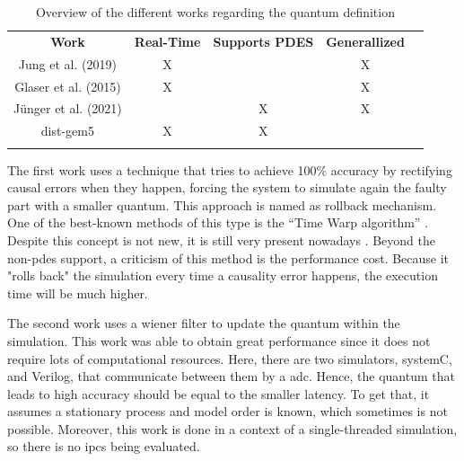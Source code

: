 \begin{table}[H]
\centering
\begin{tabular}{ccccl}
\cline{1-4}
\multicolumn{1}{|c|}{\cellcolor[HTML]{9B9B9B}\textbf{Work}} & \multicolumn{1}{c|}{\cellcolor[HTML]{9B9B9B}\textbf{Real-Time}} & \multicolumn{1}{c|}{\cellcolor[HTML]{9B9B9B}\textbf{Supports PDES}} & \multicolumn{1}{c|}{\cellcolor[HTML]{9B9B9B}\textbf{Generallized}} &  \\ \cline{1-4}
\multicolumn{1}{|c|}{Jung et al. \cite{optimist2} (2019)} & \multicolumn{1}{c|}{X} & \multicolumn{1}{c|}{} & \multicolumn{1}{c|}{X} &  \\ \cline{1-4}
\multicolumn{1}{|c|}{Glaser et al. \cite{GlaserTD} (2015)} & \multicolumn{1}{c|}{X} & \multicolumn{1}{c|}{} & \multicolumn{1}{c|}{X} &  \\ \cline{1-4}
\multicolumn{1}{|c|}{Jünger et al. \cite{optimizingTD} (2021)} & \multicolumn{1}{c|}{} & \multicolumn{1}{c|}{X} & \multicolumn{1}{c|}{X} &  \\ \cline{1-4}
\multicolumn{1}{|c|}{dist-gem5 \cite{dist-gem5}} & \multicolumn{1}{c|}{X} & \multicolumn{1}{c|}{X} & \multicolumn{1}{c|}{} &  \\ \cline{1-4}
\multicolumn{1}{l}{} & \multicolumn{1}{l}{} & \multicolumn{1}{l}{} & \multicolumn{1}{l}{} & 
\end{tabular}
\caption{Overview of the different works regarding the quantum definition}
\label{tab_OverviewDynamicQuantum}
\end{table}

The first work uses a technique that tries to achieve 100\% accuracy by rectifying causal errors when they happen, forcing the system to simulate again the faulty part with a smaller quantum. This approach is named as rollback mechanism. One of the best-known methods of this type is the “Time
Warp algorithm” \cite{jefferson1985virtual}. Despite this concept is not new, it is still very present nowadays \cite{busnot2020standard}. Beyond the non-\gls{pdes} support, a criticism of this method is the performance cost. Because it "rolls back" the simulation every time a causality error happens, the execution time will be much higher.

The second work uses a wiener filter to update the quantum within the simulation. This work was able to obtain great performance since it does not require lots of computational resources. Here, there are two simulators, systemC, and Verilog, that communicate between them by a \gls{adc}. Hence, the quantum that leads to high accuracy should be equal to the smaller latency. To get that, it assumes a stationary process and model order is known, which sometimes is not possible. Moreover, this work is done in a context of a single-threaded simulation, so there is no \glspl{ipc} being evaluated.

